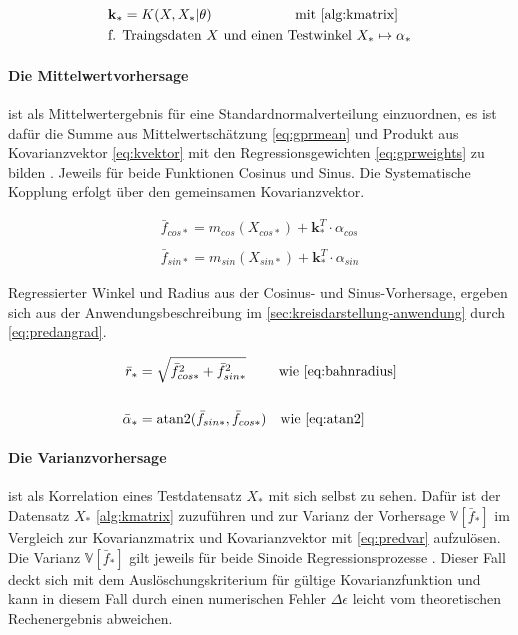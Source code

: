 \begin{align}\label{eq:kvektor}
	& \mathbf{k}_* =  K(X, X_* | \theta) \qquad\qquad\qquad \text{mit } \text{\autoref{alg:kmatrix}} \\
	& \text{f. Traingsdaten } X \text{ und } \text{einen Testwinkel } X_* \mapsto \alpha_* \nonumber
\end{align}


\clearpage


\paragraph*{Die Mittelwertvorhersage} ist als Mittelwertergebnis für eine Standardnormalverteilung einzuordnen, es ist dafür die Summe aus Mittelwertschätzung \autoref{eq:gprmean} und Produkt aus Kovarianzvektor \autoref{eq:kvektor} mit den Regressionsgewichten \autoref{eq:gprweights} zu bilden \cite{Rasmussen2006}. Jeweils für beide Funktionen Cosinus und Sinus. Die Systematische Kopplung erfolgt über den gemeinsamen Kovarianzvektor.


\begin{align}\label{eq:predmean}
	\bar{f}_{cos*} = m_{cos}(X_{cos*}) + \mathbf{k}_*^T \cdot \alpha_{cos} \nonumber \\
	\\
	\bar{f}_{sin*} = m_{sin}(X_{sin*}) + \mathbf{k}_*^T \cdot \alpha_{sin} \nonumber
\end{align}


Regressierter Winkel und Radius aus der Cosinus- und Sinus-Vorhersage, ergeben sich aus der Anwendungsbeschreibung im \autoref{sec:kreisdarstellung-anwendung} durch \autoref{eq:predangrad}.


\begin{align}\label{eq:predangrad}
	\bar{r}_* &= \sqrt{\bar{f}_{cos*}^2 + \bar{f}_{sin*}^2} \quad\quad\ \text{wie \autoref{eq:bahnradius}} \nonumber \\
	\\
	\bar{\alpha}_* &= \text{atan2}(\bar{f}_{sin*}, \bar{f}_{cos*}) \quad \text{wie \autoref{eq:atan2}} \nonumber
\end{align}


\paragraph*{Die Varianzvorhersage} ist als Korrelation eines Testdatensatz $X_*$ mit sich selbst zu sehen. Dafür ist der Datensatz $X_*$ \autoref{alg:kmatrix} zuzuführen und zur Varianz der Vorhersage $\mathbb{V}\left[ \bar{f}_* \right]$ im Vergleich zur Kovarianzmatrix und Kovarianzvektor mit \autoref{eq:predvar} aufzulösen. Die Varianz $\mathbb{V}\left[ \bar{f}_* \right]$ gilt jeweils für beide Sinoide Regressionsprozesse \cite{Rasmussen2006}. Dieser Fall deckt sich mit dem Auslöschungskriterium für gültige Kovarianzfunktion und kann in diesem Fall durch einen numerischen Fehler $\Delta\epsilon$ leicht vom theoretischen Rechenergebnis abweichen.


